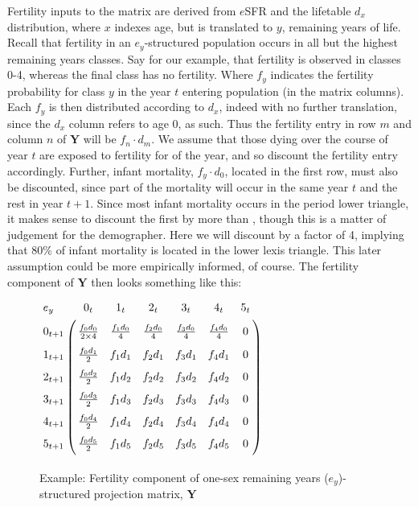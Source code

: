  Fertility inputs to the matrix are derived from $e$SFR and the lifetable $d_x$
 distribution, where $x$ indexes age, but is translated to $y$, remaining years
 of life. Recall that fertility in an $e_y$-structured population occurs in all
 but the highest remaining years classes. Say for our example, that fertility is
 observed in classes 0-4, whereas the final class has no fertility. Where $f_y$
 indicates the fertility probability for class $y$ in the year $t$ entering
 population (in the matrix columns). Each $f_y$ is then distributed according to
 $d_x$, indeed with no further translation, since the $d_x$ column refers to age
 0, as such. Thus the fertility entry in row $m$ and column $n$ of $\textbf{Y}$
 will be $f_n \cdot d_m$. We assume that those dying over the course of year
 $t$ are exposed to fertility for \textonehalf of the year, and so discount the
 fertility entry accordingly. Further, infant mortality, $f_y \cdot d_0$,
 located in the first row, must also be discounted, since part of the mortality
 will occur in the same year $t$ and the rest in year $t+1$. Since most infant
 mortality occurs in the period lower triangle, it makes sense to discount the
 first by more than \textonehalf, though this is a matter of judgement for the
 demographer. Here we will discount by a factor of 4, implying that 80\% of
 infant mortality is located in the lower lexis triangle. This later assumption
 could be more empirically informed, of course. The fertility component of
 $\textbf{Y}$ then looks something like this:

\begin{figure}[h!]
\centering
\caption*{Example: Fertility component of one-sex remaining years
($e_y$)-structured projection matrix, $\textbf{Y}$} 
$\bordermatrix{
  {e_y } \vspace{.6em}&                0_t  & 1_t  & 2_t  & 3_t  & 4_t  & 5_t\cr 
   0_{t+1} \vspace{.6em}& \tfrac{f_0d_0}{2 \times 4} &
   \tfrac{f_1d_0}{4} & \tfrac{f_2d_0}{4} & \tfrac{f_3d_0}{4} & \tfrac{f_4d_0}{4}& 0 \cr 
   1_{t+1} \vspace{.6em}& \tfrac{f_0d_1}{2} & f_1d_1 & f_2d_1 & f_3d_1 & f_4d_1
   & 0   \cr 2_{t+1} \vspace{.6em}& \tfrac{f_0d_2}{2} & f_1d_2 & f_2d_2 & f_3d_2 & f_4d_2
   & 0   \cr 3_{t+1} \vspace{.6em}& \tfrac{f_0d_3}{2} & f_1d_3 & f_2d_3 & f_3d_3 & f_4d_3
   & 0   \cr 4_{t+1} \vspace{.6em}& \tfrac{f_0d_4}{2} & f_1d_4 & f_2d_4 & f_3d_4 & f_4d_4
   & 0   \cr 5_{t+1} \vspace{.6em}& \tfrac{f_0d_5}{2} & f_1d_5 & f_2d_5 & f_3d_5 & f_4d_5
   & 0   }$
\end{figure}

